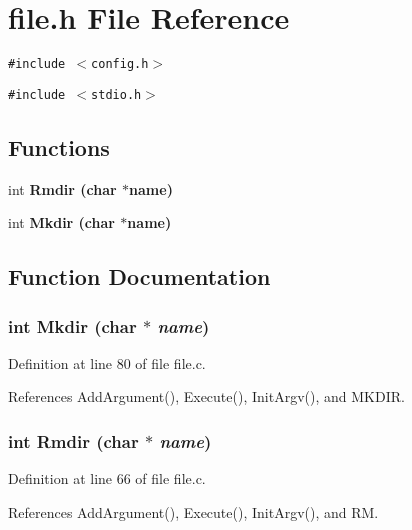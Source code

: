 \section{file.h File Reference}
\label{file_8h}
{\tt \#include $<$config.h$>$}\par
{\tt \#include $<$stdio.h$>$}\par
\subsection*{Functions}
\begin{CompactItemize}
\item 
int \bf{Rmdir} (char $\ast$\bf{name})
\item 
int \bf{Mkdir} (char $\ast$\bf{name})
\end{CompactItemize}


\subsection{Function Documentation}
\subsubsection{\setlength{\rightskip}{0pt plus 5cm}int Mkdir (char $\ast$ {\em name})}\label{file_8h_244d068470944621e2a49d524851541f}




Definition at line 80 of file file.c.

References Add\-Argument(), Execute(), Init\-Argv(), and MKDIR.
\subsubsection{\setlength{\rightskip}{0pt plus 5cm}int Rmdir (char $\ast$ {\em name})}\label{file_8h_0a261a55a87fb3d112e9a02f828b99c5}




Definition at line 66 of file file.c.

References Add\-Argument(), Execute(), Init\-Argv(), and RM.